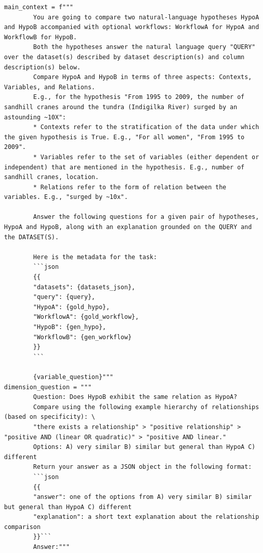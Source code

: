 \begin{listing}[!ht]
\begin{verbatim}
main_context = f"""
        You are going to compare two natural-language hypotheses HypoA and HypoB accompanied with optional workflows: WorkflowA for HypoA and WorkflowB for HypoB.
        Both the hypotheses answer the natural language query "QUERY" over the dataset(s) described by dataset description(s) and column description(s) below.
        Compare HypoA and HypoB in terms of three aspects: Contexts, Variables, and Relations.
        E.g., for the hypothesis "From 1995 to 2009, the number of sandhill cranes around the tundra (Indigilka River) surged by an astounding ~10X":
        * Contexts refer to the stratification of the data under which the given hypothesis is True. E.g., "For all women", "From 1995 to 2009". 
        * Variables refer to the set of variables (either dependent or independent) that are mentioned in the hypothesis. E.g., number of sandhill cranes, location.
        * Relations refer to the form of relation between the variables. E.g., "surged by ~10x".

        Answer the following questions for a given pair of hypotheses, HypoA and HypoB, along with an explanation grounded on the QUERY and the DATASET(S).

        Here is the metadata for the task:
        ```json
        {{
        "datasets": {datasets_json},
        "query": {query},
        "HypoA": {gold_hypo},
        "WorkflowA": {gold_workflow},
        "HypoB": {gen_hypo},
        "WorkflowB": {gen_workflow}
        }}
        ```

        {variable_question}"""
dimension_question = """
        Question: Does HypoB exhibit the same relation as HypoA?
        Compare using the following example hierarchy of relationships (based on specificity): \
        "there exists a relationship" > "positive relationship" > "positive AND (linear OR quadratic)" > "positive AND linear."
        Options: A) very similar B) similar but general than HypoA C) different
        Return your answer as a JSON object in the following format:
        ```json
        {{
        "answer": one of the options from A) very similar B) similar but general than HypoA C) different
        "explanation": a short text explanation about the relationship comparison
        }}```
        Answer:"""
\end{verbatim}
\vspace{-1em}
\caption{Prompt for relationship alignment between two sub-hypotheses.}
\label{list:rel}
\end{listing}


